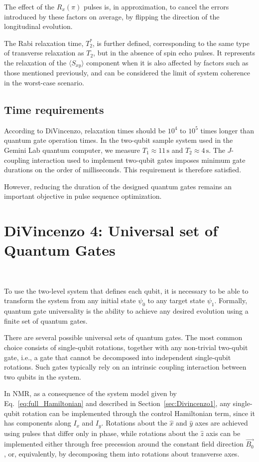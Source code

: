 The effect of the \(R_x(\pi)\) pulses is, in approximation, to cancel the errors introduced by these factors on average, by flipping the direction of the longitudinal evolution.

The Rabi relaxation time, \(T_2^*\), is further defined, corresponding to the same type of transverse relaxation as \(T_2\), but in the absence of spin echo pulses. It represents the relaxation of the \(\langle S_{xy}\rangle\) component when it is also affected by factors such as those mentioned previously, and can be considered the limit of system coherence in the worst-case scenario.

\subsection{Time requirements}
\label{subsec:time_requirements}

According to DiVincenzo, relaxation times should be \(10^4\) to \(10^5\) times longer than quantum gate operation times. In the two-qubit sample system used in the Gemini Lab quantum computer, we measure \(T_1 \approx 11\,\text{s}\) and \(T_2 \approx 4\,\text{s}\). The \(J\)-coupling interaction used to implement two-qubit gates imposes minimum gate durations on the order of milliseconds. This requirement is therefore satisfied.

However, reducing the duration of the designed quantum gates remains an important objective in pulse sequence optimization.


\section{DiVincenzo 4: Universal set of Quantum Gates}
~\label{sec:Divincenzo4}

To use the two-level system that defines each qubit, it is necessary to be able to transform the system from any initial state \(\psi_0\) to any target state \(\psi_1\). Formally, quantum gate universality is the ability to achieve any desired evolution using a finite set of quantum gates.

There are several possible universal sets of quantum gates. The most common choice consists of single-qubit rotations, together with any non-trivial two-qubit gate, i.e., a gate that cannot be decomposed into independent single-qubit rotations. Such gates typically rely on an intrinsic coupling interaction between two qubits in the system.

In NMR, as a consequence of the system model given by Eq.~\ref{eq:full_Hamiltonian} and described in Section~\ref{sec:Divincenzo1}, any single-qubit rotation can be implemented through the control Hamiltonian term, since it has components along \(I_x\) and \(I_y\). Rotations about the \(\hat{x}\) and \(\hat{y}\) axes are achieved using pulses that differ only in phase, while rotations about the \(\hat{z}\) axis can be implemented either through free precession around the constant field direction \(\vec{B_0}\), or, equivalently, by decomposing them into rotations about transverse axes.

